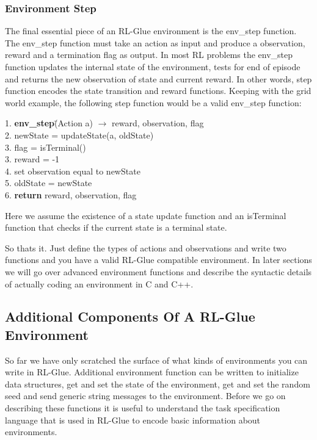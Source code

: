 \documentclass[11pt]{article}
\begin{document}
\subsubsection{Environment Step}
The final essential piece of an RL-Glue environment is the env\_step function. The env\_step function must take an action as input and produce a observation, reward and a termination flag as output. In most RL problems the  env\_step function updates the internal state of the environment, tests for end of episode and returns the new observation of state and current reward. In other words, step function encodes the state transition and reward functions. Keeping with the grid world example, the following step function would be a valid env\_step function:
\begin{tabbing}
1. {\bf env\_step}\=(Action a) $\rightarrow$ reward, observation, flag \\
2. \>newState = updateState(a, oldState)\\
3. \> flag = isTerminal()\\
3. \> reward = -1\\
4. \>set observation equal to newState\\
5. \>oldState = newState\\
6. {\bf return} reward, observation, flag
\end{tabbing}
Here we assume the existence of a state update function and an isTerminal function that checks if the current state is a terminal state.

So thats it. Just define the types of actions and observations and write two functions and you have a valid RL-Glue compatible environment. In later sections we will go over advanced environment functions and describe the syntactic details of actually coding an environment in C and C++. 

\subsection{Additional Components Of A RL-Glue Environment}
\label{envp2}

So far we have only scratched the surface of what kinds of environments you can write in RL-Glue. Additional environment function can be written to initialize data structures, get and set the state of the environment, get and set the random seed and send generic string messages to the environment. Before we go on describing these functions it is useful to understand the task specification language that is used in RL-Glue to encode basic information about environments. 
\end{document}
